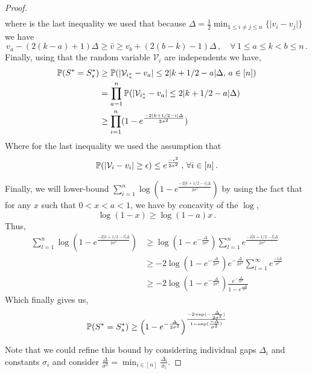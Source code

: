 \begin{proof}
\begin{align*}
\end{align*}
where is the last inequality we used that because $\Delta = \tfrac{1}{2}\min_{1\leq i \neq j \leq  n } \{\mid v_i - v_j \mid \}
$ we have
\begin{equation}
    v_a - (2(k-a)+1)\Delta \geq \bar v \geq  v_b + (2(b-k)-1) \Delta \,, \quad \forall \, 1 \leq a \leq k < b \leq n \,.
\end{equation}
Finally, using that the random variable $\mathcal{V}_i$ are independents we have,
\begin{align*}
    {\mathbb{P}}(S^*=S^*_s)      
    & \geq {\mathbb{P}}(|\mathcal{V}_{i_a^*} - v_a| \leq  2|k+1/2-a|\Delta, \,a \in [n]) \\
    & = \prod_{a=1}^n {\mathbb{P}}(|\mathcal{V}_{i_a^*} - v_a| \leq  2|k+1/2-a|\Delta) \\
    & \geq \prod_{i=1}^n  (1 - e^{\frac{-2|k+1/2-i|\Delta}{2\sigma^2}})
\end{align*}
Where for the last inequality we used the assumption that 
\begin{equation}
    {\mathbb{P}}( |\mathcal{V}_i-v_i| \geq \epsilon) \leq e^{\frac{-\epsilon^2}{2\sigma^2}} \,,\,\forall i \in [n]\,.
\end{equation}

Finally, we will lower-bound $\sum_{i=1}^n\log (1 - e^{\frac{-2|k+1/2-i|\Delta}{2\sigma^2}})$ by using the fact that for any $x$ such that $0<x<a<1$, we have by concavity of the $\log$,
\begin{equation}
    \log(1-x) \geq \log(1-a) x \,.
\end{equation}
Thus,
\begin{align}
    \sum_{l=1}^n\log (1 - e^{\frac{-2|k+1/2-l|\Delta}{2\sigma^2}}) 
    & \geq \log(1-e^{- \frac{\Delta}{2 \sigma^2}}) \sum_{l=1}^n e^{\frac{-2|k+1/2-l|\Delta}{2\sigma^2}} \\
    & \geq -2\log(1-e^{- \frac{\Delta}{2 \sigma^2}}) e^{- \frac{\Delta}{2 \sigma^2}} \sum_{l=1}^{\infty} e^{\frac{-l\Delta}{\sigma^2}} \\
    & \geq -2\log(1-e^{- \frac{\Delta}{2 \sigma^2}}) \frac{e^{- \frac{\Delta}{2 \sigma^2}} }{1 -  e^{\frac{-\Delta}{\sigma^2}}}
\end{align}
Which finally gives us,
\begin{equation}
     {\mathbb{P}}(S^*=S^*_s)    \geq \left( 1-e^{- \frac{\Delta}{2 \sigma^2}} \right)^{\frac{-2 \exp(- \frac{\Delta}{2 \sigma^2})}{1 -  \exp(\frac{-\Delta}{\sigma^2})}}
\end{equation}



Note that we could refine this bound by considering individual gaps $\Delta_i$ and constants $\sigma_i$ and consider $\frac{\Delta}{\sigma^2} = \min_{i \in [n]} \frac{\Delta_i}{\sigma_i}$.

\end{proof}


